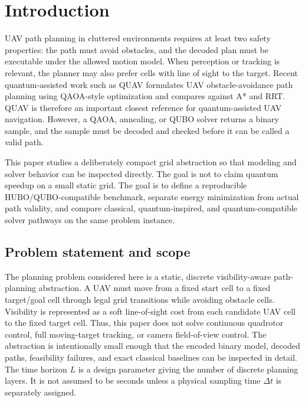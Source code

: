 \documentclass[10pt,conference]{IEEEtran}
\begin{document}
\section{Introduction}
UAV path planning in cluttered environments requires at least two safety properties: the path must avoid obstacles, and the decoded plan must be executable under the allowed motion model. When perception or tracking is relevant, the planner may also prefer cells with line of sight to the target. Recent quantum-assisted work such as QUAV formulates UAV obstacle-avoidance path planning using QAOA-style optimization and compares against A* and RRT. QUAV is therefore an important closest reference for quantum-assisted UAV navigation. However, a QAOA, annealing, or QUBO solver returns a binary sample, and the sample must be decoded and checked before it can be called a valid path.

This paper studies a deliberately compact grid abstraction so that modeling and solver behavior can be inspected directly. The goal is not to claim quantum speedup on a small static grid. The goal is to define a reproducible HUBO/QUBO-compatible benchmark, separate energy minimization from actual path validity, and compare classical, quantum-inspired, and quantum-compatible solver pathways on the same problem instance.

\subsection{Problem statement and scope}
The planning problem considered here is a static, discrete visibility-aware path-planning abstraction. A UAV must move from a fixed start cell to a fixed target/goal cell through legal grid transitions while avoiding obstacle cells. Visibility is represented as a soft line-of-sight cost from each candidate UAV cell to the fixed target cell. Thus, this paper does not solve continuous quadrotor control, full moving-target tracking, or camera field-of-view control. The abstraction is intentionally small enough that the encoded binary model, decoded paths, feasibility failures, and exact classical baselines can be inspected in detail. The time horizon $L$ is a design parameter giving the number of discrete planning layers. It is not assumed to be seconds unless a physical sampling time $\Delta t$ is separately assigned.
\end{document}
